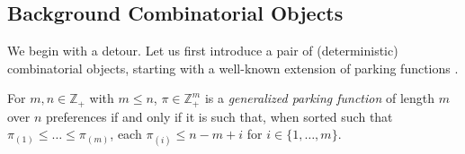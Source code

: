 \documentclass[opre,nonblindrev]{informs3_no_remark}
\newcommand{\tr}{\textcolor{red}}
\begin{document}









\subsection{Background Combinatorial Objects}


We begin with a detour. Let us first introduce a pair of (deterministic) combinatorial objects, starting with a well-known extension of parking functions \citep[see, e.g.,][]{stanley2002polytope,yan2015parking}.

\begin{definition}\label{gpfDef1}
For $m, n \in \mathbb{Z}_+$ with $m \leq n$, $\pi \in \mathbb{Z}_+^m$ is a \emph{generalized parking function} of length $m$ over $n$ preferences if and only if it is such that, when sorted such that $\pi_{(1)} \leq \dots \leq \pi_{(m)}$, each $\pi_{(i)} \leq n - m + i$ for $i \in \{1, \dots, m\}$.\hfill \Halmos 
\end{definition}
\end{document}
